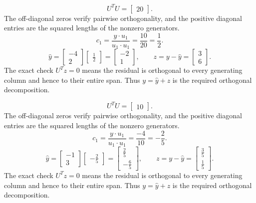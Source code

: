 \[U^TU=\left[\begin{array}{r}20\end{array}\right].\]
The off-diagonal zeros verify pairwise orthogonality, and the positive diagonal entries are the squared lengths of the nonzero generators.
\[c_{1}=\frac{y\cdot u_{1}}{u_{1}\cdot u_{1}}=\frac{10}{20}=\frac{1}{2}.\]
\[\widehat y=\left[\begin{array}{r}-4\\2\end{array}\right]\left[\begin{array}{r}\frac{1}{2}\end{array}\right]=\left[\begin{array}{r}-2\\1\end{array}\right],\qquad z=y-\widehat y=\left[\begin{array}{r}3\\6\end{array}\right].\]
The exact check $U^Tz=0$ means the residual is orthogonal to every generating column and hence to their entire span. Thus $y=\widehat y+z$ is the required orthogonal decomposition.


\[U^TU=\left[\begin{array}{r}10\end{array}\right].\]
The off-diagonal zeros verify pairwise orthogonality, and the positive diagonal entries are the squared lengths of the nonzero generators.
\[c_{1}=\frac{y\cdot u_{1}}{u_{1}\cdot u_{1}}=\frac{-4}{10}=- \frac{2}{5}.\]
\[\widehat y=\left[\begin{array}{r}-1\\3\end{array}\right]\left[\begin{array}{r}- \frac{2}{5}\end{array}\right]=\left[\begin{array}{r}\frac{2}{5}\\- \frac{6}{5}\end{array}\right],\qquad z=y-\widehat y=\left[\begin{array}{r}\frac{3}{5}\\\frac{1}{5}\end{array}\right].\]
The exact check $U^Tz=0$ means the residual is orthogonal to every generating column and hence to their entire span. Thus $y=\widehat y+z$ is the required orthogonal decomposition.


